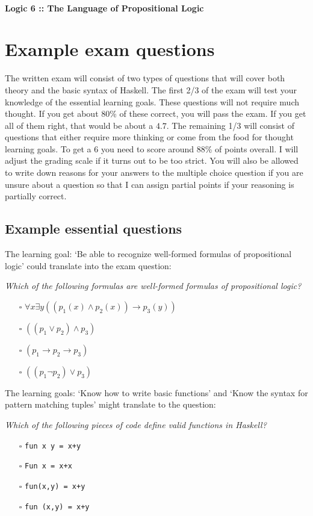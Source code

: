 \documentclass{article}[12pt]
\begin{document}
\paragraph{Logic 6 :: The Language of Propositional Logic}

\section{Example exam questions}
The written exam will consist of two types of questions that will cover both theory and the basic syntax of Haskell. The first 2/3 of the exam will test your knowledge of the essential learning goals. These questions will not require much thought. If you get about 80\% of these correct, you will pass the exam. If you get all of them right, that would be about a $4.7$. The remaining 1/3 will consist of questions that either require more thinking or come from the food for thought learning goals. To get a $6$ you need to score around 88\% of points overall. I will adjust the grading scale if it turns out to be too strict. You will also be allowed to write down reasons for your answers to the multiple choice question if you are unsure about a question so that I can assign partial points if your reasoning is partially correct.

\subsection{Example essential questions}
The learning goal: `Be able to recognize well-formed formulas of propositional logic' could translate into the exam question:

\emph{Which of the following formulas are well-formed formulas of propositional logic?}
\begin{itemize}
    \item[$\square$] $\forall x \exists y ((p_1(x) \wedge p_2(x) ) \rightarrow p_3(y))$
    \item[$\square$] $ ((p_1 \vee p_2) \wedge p_3) $
    \item[$\square$] $ (p_1 \rightarrow p_2 \rightarrow p_3)$
    \item[$\square$] $ ((p_1 \neg p_2) \vee p_3 )$
\end{itemize}

The learning goals: `Know how to write basic functions' and `Know the syntax for pattern matching tuples' might translate to the question:

\emph{Which of the following pieces of code define valid functions in Haskell?}
\begin{itemize}
    \item[$\square$] \verb|fun x y = x+y|
    \item[$\square$] \verb|Fun x = x+x|
    \item[$\square$] \verb|fun(x,y) = x+y|
    \item[$\square$] \verb|fun (x,y) = x+y|
\end{itemize}
\end{document}
